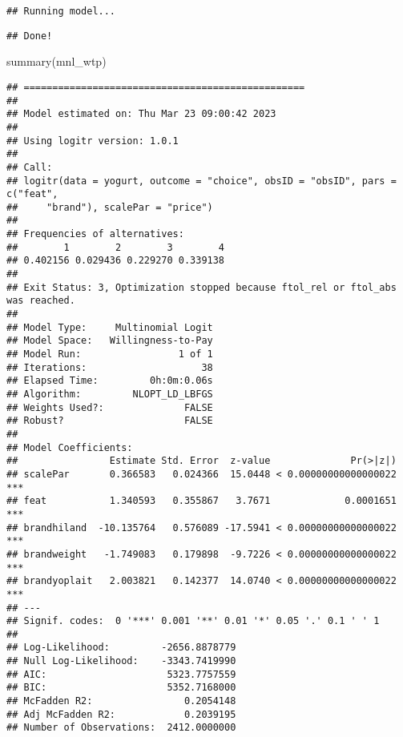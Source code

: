 \documentclass[
]{article}
\newenvironment{Shaded}{\begin{snugshade}}{\end{snugshade}}
\newcommand{\FunctionTok}[1]{\textcolor[rgb]{0.00,0.00,0.00}{#1}}
\newcommand{\NormalTok}[1]{#1}
\begin{document}
\begin{verbatim}
## Running model...
\end{verbatim}

\begin{verbatim}
## Done!
\end{verbatim}

\begin{Shaded}
\begin{Highlighting}[]
\FunctionTok{summary}\NormalTok{(mnl\_wtp)}
\end{Highlighting}
\end{Shaded}

\begin{verbatim}
## =================================================
## 
## Model estimated on: Thu Mar 23 09:00:42 2023 
## 
## Using logitr version: 1.0.1 
## 
## Call:
## logitr(data = yogurt, outcome = "choice", obsID = "obsID", pars = c("feat", 
##     "brand"), scalePar = "price")
## 
## Frequencies of alternatives:
##        1        2        3        4 
## 0.402156 0.029436 0.229270 0.339138 
## 
## Exit Status: 3, Optimization stopped because ftol_rel or ftol_abs was reached.
##                                  
## Model Type:     Multinomial Logit
## Model Space:   Willingness-to-Pay
## Model Run:                 1 of 1
## Iterations:                    38
## Elapsed Time:         0h:0m:0.06s
## Algorithm:         NLOPT_LD_LBFGS
## Weights Used?:              FALSE
## Robust?                     FALSE
## 
## Model Coefficients: 
##                Estimate Std. Error  z-value              Pr(>|z|)    
## scalePar       0.366583   0.024366  15.0448 < 0.00000000000000022 ***
## feat           1.340593   0.355867   3.7671             0.0001651 ***
## brandhiland  -10.135764   0.576089 -17.5941 < 0.00000000000000022 ***
## brandweight   -1.749083   0.179898  -9.7226 < 0.00000000000000022 ***
## brandyoplait   2.003821   0.142377  14.0740 < 0.00000000000000022 ***
## ---
## Signif. codes:  0 '***' 0.001 '**' 0.01 '*' 0.05 '.' 0.1 ' ' 1
##                                      
## Log-Likelihood:         -2656.8878779
## Null Log-Likelihood:    -3343.7419990
## AIC:                     5323.7757559
## BIC:                     5352.7168000
## McFadden R2:                0.2054148
## Adj McFadden R2:            0.2039195
## Number of Observations:  2412.0000000
\end{verbatim}
\end{document}
